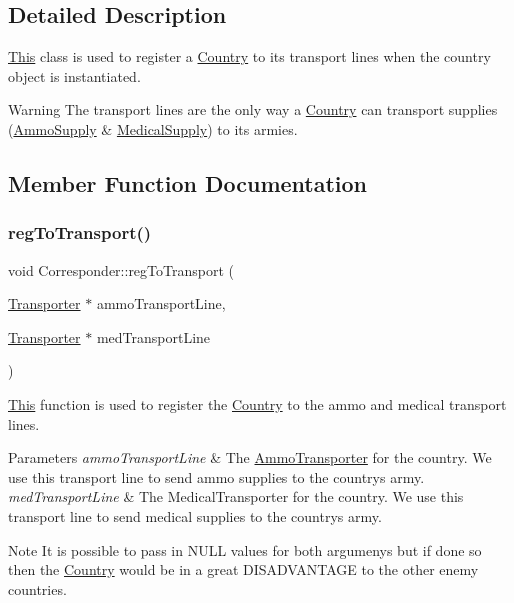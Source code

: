 \subsection{Detailed Description}
\mbox{\hyperlink{class_this}{This}} class is used to register a \mbox{\hyperlink{class_country}{Country}} to its transport lines when the country object is instantiated.

\begin{DoxyWarning}{Warning}
The transport lines are the only way a \mbox{\hyperlink{class_country}{Country}} can transport supplies (\mbox{\hyperlink{class_ammo_supply}{Ammo\+Supply}} \& \mbox{\hyperlink{class_medical_supply}{Medical\+Supply}}) to its armies. 
\end{DoxyWarning}


\subsection{Member Function Documentation}
\mbox{\label{class_corresponder_a77d76ef09fc2484cd5c84b1cc96bfe9c}} 
\subsubsection{\texorpdfstring{regToTransport()}{regToTransport()}}
{\footnotesize\ttfamily void Corresponder\+::reg\+To\+Transport (\begin{DoxyParamCaption}\item[{\mbox{\hyperlink{class_transporter}{Transporter}} $\ast$}]{ammo\+Transport\+Line,  }\item[{\mbox{\hyperlink{class_transporter}{Transporter}} $\ast$}]{med\+Transport\+Line }\end{DoxyParamCaption})}



\mbox{\hyperlink{class_this}{This}} function is used to register the \mbox{\hyperlink{class_country}{Country}} to the ammo and medical transport lines. 


\begin{DoxyParams}{Parameters}
{\em ammo\+Transport\+Line} & The \mbox{\hyperlink{class_ammo_transporter}{Ammo\+Transporter}} for the country. We use this transport line to send ammo supplies to the country\textquotesingle{}s army. \\
\hline
{\em med\+Transport\+Line} & The Medical\+Transporter for the country. We use this transport line to send medical supplies to the country\textquotesingle{}s army. \\
\hline
\end{DoxyParams}
\begin{DoxyNote}{Note}
It is possible to pass in N\+U\+LL values for both argumenys but if done so then the \mbox{\hyperlink{class_country}{Country}} would be in a great D\+I\+S\+A\+D\+V\+A\+N\+T\+A\+GE to the other enemy countries. 
\end{DoxyNote}


